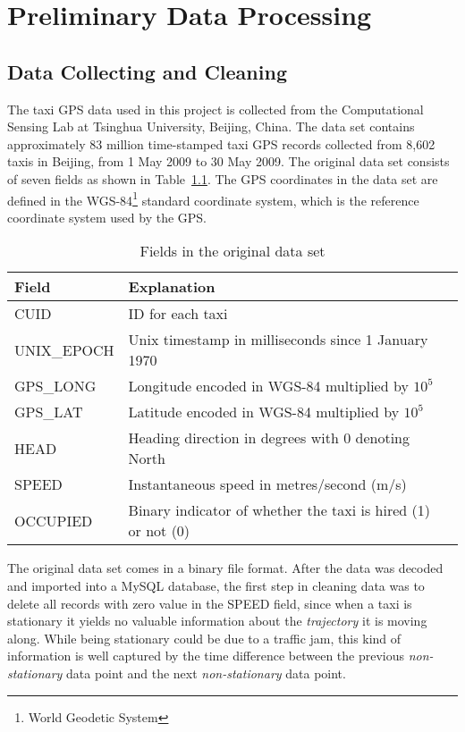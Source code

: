 \chapter{Preliminary Data Processing}
\section{Data Collecting and Cleaning}
The taxi GPS data used in this project is collected from the Computational Sensing Lab\cite{BPLL13} at Tsinghua University, Beijing, China. The data set contains approximately 83 million time-stamped taxi GPS records collected from 8,602 taxis in Beijing, from 1 May 2009 to 30 May 2009. The original data set consists of seven fields as shown in Table~\ref{Ta:orig_field}. The GPS coordinates in the data set are defined in the WGS-84\footnote{World Geodetic System} standard coordinate system, which is the reference coordinate system used by the GPS.

\begin{table}
\centering
\begin{tabular}{ | l | l | l | }
\hline
\textbf{Field} & \textbf{Explanation} \\ \hline
CUID & ID for each taxi \\ \hline
UNIX\_EPOCH & Unix timestamp in milliseconds since 1 January 1970\\ \hline
GPS\_LONG & Longitude encoded in WGS-84 multiplied by $10^{5}$\\ \hline
GPS\_LAT & Latitude encoded in WGS-84 multiplied by $10^{5}$ \\ \hline
HEAD & Heading direction in degrees with 0 denoting North\\ \hline
SPEED & Instantaneous speed in metres/second (m/s)\\ \hline
OCCUPIED & Binary indicator of whether the taxi is hired (1) or not (0)\\ \hline
\end{tabular}
\caption{Fields in the original data set}\label{Ta:orig_field}
\end{table}

The original data set comes in a binary file format. After the data was decoded and imported into a MySQL database, the first step in cleaning data was to delete all records with zero value in the SPEED field, since when a taxi is stationary it yields no valuable information about the \emph{trajectory} it is moving along. While being stationary could be due to a traffic jam, this kind of information is well captured by the time difference between the previous \emph{non-stationary} data point and the next \emph{non-stationary} data point. 

